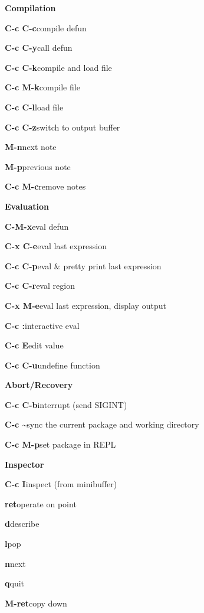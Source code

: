 \documentclass[a4paper,10pt]{article}
\newcommand{\group}[1]{\bigskip\par\noindent\textbf{\large#1}\medskip}
\newcommand{\key}[2]{\par\noindent\textbf{#1}\hfill{#2}}
\begin{document}
\group{Compilation}

\key{C-c C-c}{compile defun}
\key{C-c C-y}{call defun}
\key{C-c C-k}{compile and load file}
\key{C-c M-k}{compile file}
\key{C-c C-l}{load file}
\key{C-c C-z}{switch to output buffer}
\key{M-n}{next note}
\key{M-p}{previous note}
\key{C-c M-c}{remove notes}

\group{Evaluation}

\key{C-M-x}{eval defun}
\key{C-x C-e}{eval last expression}
\key{C-c C-p}{eval \& pretty print last expression}
\key{C-c C-r}{eval region}
\key{C-x M-e}{eval last expression, display output}
\key{C-c :}{interactive eval}
\key{C-c E}{edit value}
\key{C-c C-u}{undefine function}

\group{Abort/Recovery}

\key{C-c C-b}{interrupt (send SIGINT)}
\key{C-c \~}{sync the current package and working directory}
\key{C-c M-p}{set package in REPL}

\group{Inspector}

\key{C-c I}{inspect (from minibuffer)}
\key{ret}{operate on point}
\key{d}{describe}
\key{l}{pop}
\key{n}{next}
\key{q}{quit}
\key{M-ret}{copy down}
\end{document}
